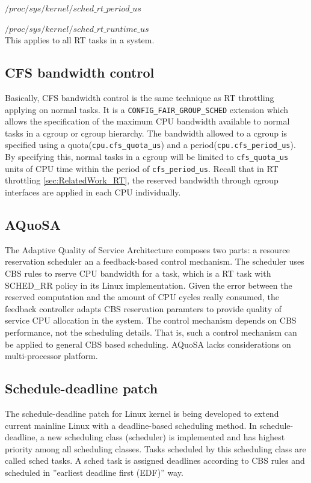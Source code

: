 	$/proc/sys/kernel/sched\_rt\_period\_us$ 

	$/proc/sys/kernel/sched\_rt\_runtime\_us$ 
\\This applies to all RT tasks in a system.

\subsection{CFS bandwidth control\label{RelatedWork_CFS}}
Basically, CFS bandwidth control is the same technique as RT throttling
applying on normal tasks. It is a \texttt{CONFIG\_FAIR\_GROUP\_SCHED} 
extension which allows the specification of the maximum CPU bandwidth
available to normal tasks  in a cgroup or cgroup hierarchy.
The bandwidth allowed to a cgroup is specified using a 
quota(\texttt{cpu.cfs\_quota\_us}) and a period(\texttt{cpu.cfs\_period\_us}).
By specifying this, normal tasks in a cgroup will be limited to 
\texttt{cfs\_quota\_us} units of CPU time within the period of 
\texttt{cfs\_period\_us}. Recall that in RT throttling \ref{sec:RelatedWork_RT},
the reserved bandwidth through cgroup interfaces are applied in each CPU
individually.
\subsection{AQuoSA\label{sec:AQuoSA}}
The Adaptive Quality of Service Architecture composes two parts: 
a resource reservation scheduler an a feedback-based
control mechanism. The scheduler uses CBS rules to rserve CPU bandwidth for
a task, which is a RT task with SCHED\_RR policy in its Linux implementation.
Given the error between the reserved computation and the amount of CPU cycles
really consumed, the feedback controller adapts CBS reservation paramters to
provide quality of service CPU allocation in the system.
The control mechanism depends on CBS performance, not the scheduling details.
That is, such a control mechanism can be applied to general CBS based 
scheduling. AQuoSA lacks considerations on multi-processor platform.
  
\subsection{Schedule-deadline patch}
The schedule-deadline patch for Linux kernel is being developed to extend
current mainline Linux with a deadline-based scheduling method. 
In schedule-deadline, a new scheduling class (scheduler) is implemented and 
has highest priority among all scheduling classes. Tasks scheduled by this
scheduling class are called sched tasks. A sched task is assigned deadlines
according to CBS rules and scheduled in ''earliest deadline first (EDF)'' way.
